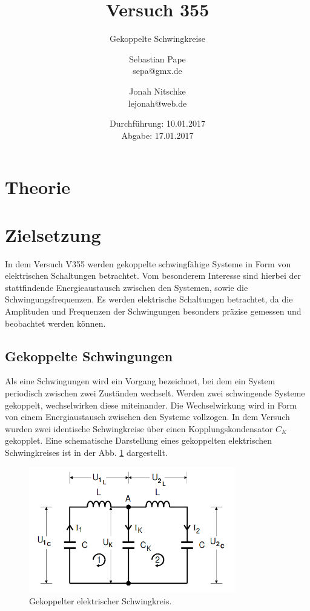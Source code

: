 

\title{Versuch 355}
\subtitle{Gekoppelte Schwingkreise}
\author{Sebastian Pape\\
        sepa@gmx.de \and
        Jonah Nitschke\\
        lejonah@web.de}
\date{Durchführung: 10.01.2017\\
      Abgabe: 17.01.2017}


\maketitle
\setcounter{page}{1}

\section{Theorie}

\section{Zielsetzung}

In dem Versuch V355 werden gekoppelte schwingfähige Systeme in Form von elektrischen
Schaltungen betrachtet. Vom besonderem Interesse sind hierbei der stattfindende
Energieaustausch zwischen den Systemen, sowie die Schwingungsfrequenzen.
Es werden elektrische Schaltungen betrachtet, da die Amplituden und Frequenzen
der Schwingungen besonders präzise gemessen und beobachtet werden können.

\subsection{Gekoppelte Schwingungen}

Als eine Schwingungen wird ein Vorgang bezeichnet, bei dem ein System periodisch
zwischen zwei Zuständen wechselt. Werden zwei schwingende Systeme gekoppelt,
wechselwirken diese miteinander. Die Wechselwirkung wird in Form von einem
Energiaustausch zwischen den Systeme vollzogen. In dem Versuch wurden zwei identische
Schwingkreise über einen Kopplungskondensator $C_K$ gekopplet. Eine schematische
Darstellung eines gekoppelten elektrischen Schwingkreises ist in der Abb.
\ref{fig:gekoppelterSchwingkreis} dargestellt.

\begin{figure}
  \centering
  \includegraphics[width=9cm]{V355_allg_Schwingkreis.png}
  \caption{Gekoppelter elektrischer Schwingkreis.\cite{anleitung01}\protect}
  \label{fig:gekoppelterSchwingkreis}
\end{figure}

